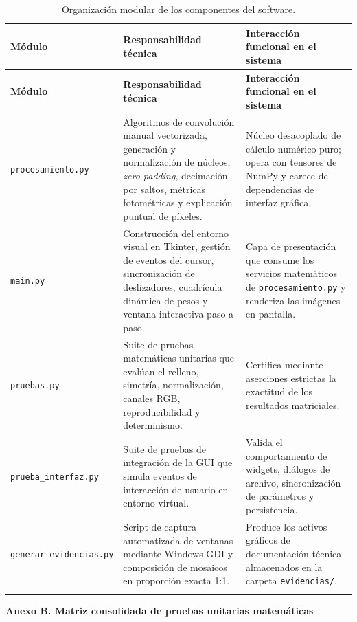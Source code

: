 \documentclass[11pt]{article}
\begin{document}
\begin{longtable}{>{\raggedright\arraybackslash}p{3.8cm}>{\raggedright\arraybackslash}p{5.2cm}>{\raggedright\arraybackslash}p{5.5cm}}
\caption{Organización modular de los componentes del software.}\\
\toprule
\textbf{Módulo} & \textbf{Responsabilidad técnica} & \textbf{Interacción funcional en el sistema} \\
\midrule\endfirsthead
\toprule
\textbf{Módulo} & \textbf{Responsabilidad técnica} & \textbf{Interacción funcional en el sistema} \\
\midrule\endhead
\texttt{procesamiento.py} & Algoritmos de convolución manual vectorizada, generación y normalización de núcleos, \textit{zero-padding}, decimación por saltos, métricas fotométricas y explicación puntual de píxeles. & Núcleo desacoplado de cálculo numérico puro; opera con tensores de NumPy y carece de dependencias de interfaz gráfica. \\
\cellcolor{azulClaro!40}\texttt{main.py} & \cellcolor{azulClaro!40}Construcción del entorno visual en Tkinter, gestión de eventos del cursor, sincronización de deslizadores, cuadrícula dinámica de pesos y ventana interactiva paso a paso. & \cellcolor{azulClaro!40}Capa de presentación que consume los servicios matemáticos de \texttt{procesamiento.py} y renderiza las imágenes en pantalla. \\
\texttt{pruebas.py} & Suite de pruebas matemáticas unitarias que evalúan el relleno, simetría, normalización, canales RGB, reproducibilidad y determinismo. & Certifica mediante aserciones estrictas la exactitud de los resultados matriciales. \\
\cellcolor{azulClaro!40}\texttt{prueba\_interfaz.py} & \cellcolor{azulClaro!40}Suite de pruebas de integración de la GUI que simula eventos de interacción de usuario en entorno virtual. & \cellcolor{azulClaro!40}Valida el comportamiento de widgets, diálogos de archivo, sincronización de parámetros y persistencia. \\
\texttt{generar\_evidencias.py} & Script de captura automatizada de ventanas mediante Windows GDI y composición de mosaicos en proporción exacta 1:1. & Produce los activos gráficos de documentación técnica almacenados en la carpeta \texttt{evidencias/}. \\
\bottomrule
\label{tab:arquitectura_software}
\end{longtable}

\textbf{Anexo B. Matriz consolidada de pruebas unitarias matemáticas}
\end{document}
